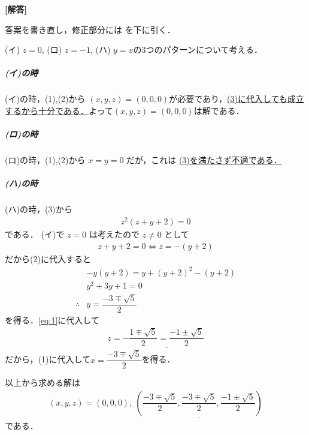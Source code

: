 \documentclass[../../main.tex]{subfiles}
\begin{document}
\begin{oframed}
  
\end{oframed}

{\bf [解答]}

答案を書き直し，修正部分には \underline{\hspace{0.8cm}} を下に引く．

(イ) $z=0$, (ロ) $z=-1$, (ハ) $y=x$の$3$つのパターンについて考える．

\subparagraph{(イ)の時}

(イ)の時，(1),(2)から $(x,y,z)=(0,0,0)$が必要であり，\underline{(3)に代入しても成立するから十分である．}よって$(x,y,z)=(0,0,0)$は解である．

\subparagraph{(ロ)の時}

(ロ)の時，(1),(2)から $x=y=0$ だが，これは \underline{(3)を満たさず不適である．}

\subparagraph{(ハ)の時}

(ハ)の時，(3)から
\begin{align}
  z^2(z+y+2)=0
\end{align}
である．
(イ)で $z=0$ は考えたので $z \neq 0$ として
\begin{align}
  z+y+2=0 \iff z=-(y+2) \label{eq:1}
\end{align}
だから(2)に代入すると
\begin{align}
  & -y(y+2) = y + (y+2)^2 - (y+2) \\
  & y^2 + 3y + 1 = 0 \\
  \therefore
  & y = \dfrac{-3 \mp \sqrt{5}}{2}
\end{align}
を得る．\cref{eq:1}に代入して
\begin{align}
  z = - \underline{\dfrac{1 \mp \sqrt{5}}{2} = \dfrac{-1 \pm \sqrt{5}}{2}}
\end{align}
だから，(1)に代入して$x = \dfrac{-3 \mp \sqrt{5}}{2}$を得る．
\casesend

以上から求める解は
\begin{align}
  (x,y,z) = (0,0,0), \ \underline{\left( \dfrac{-3 \mp \sqrt{5}}{2}, \dfrac{-3 \mp \sqrt{5}}{2}, \dfrac{-1 \pm \sqrt{5}}{2} \right)}
\end{align}
である．

\newpage
\end{document}
